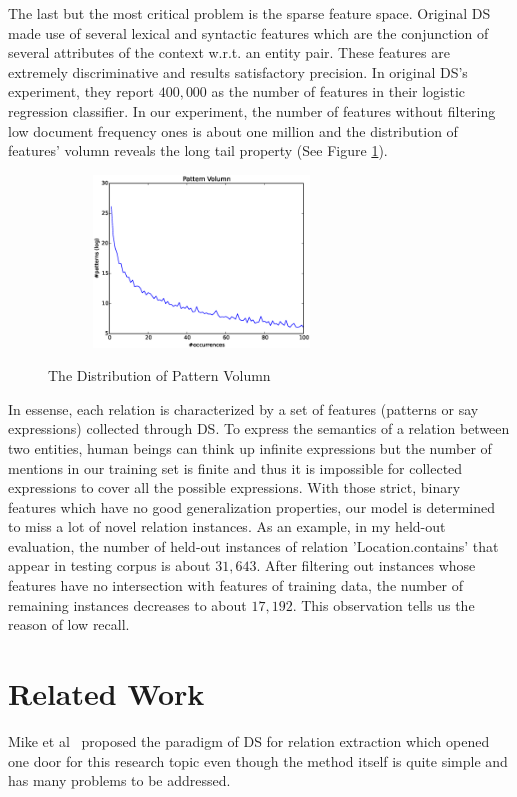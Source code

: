 \documentclass[10pt]{article} %
\theoremstyle{definition}
\theoremstyle{definition}
\begin{document}
The last but the most critical problem is the sparse feature space. 
Original DS made use of several lexical and syntactic features which are the conjunction of several attributes of the context w.r.t. an entity pair. 
These features are extremely discriminative and results satisfactory precision. 
In original DS's experiment, they report $400,000$ as the number of features in their logistic regression classifier. 
In our experiment, the number of features without filtering low document frequency ones is about one million and the distribution of features' volumn reveals the long tail property (See Figure \ref{fig:pv}). 
\begin{figure}
\centering
\includegraphics[width=3.2in,height=1.8in]{pv.eps}
\label{fig:pv}
\caption{The Distribution of Pattern Volumn}
\end{figure}
In essense, each relation is characterized by a set of features (patterns or say expressions) collected through DS. 
To express the semantics of a relation between two entities, human beings can think up infinite expressions 
but the number of mentions in our training set is finite and thus it is impossible for collected expressions to cover all the possible expressions. 
With those strict, binary features which have no good generalization properties, our model is determined to miss a lot of novel relation instances. 
As an example, in my held-out evaluation, the number of held-out instances of relation 'Location.contains' that appear in testing corpus is about $31,643$. 
After filtering out instances whose features have no intersection with features of training data, the number of remaining instances decreases to about $17,192$. 
This observation tells us the reason of low recall. 



\section{Related Work}
Mike et al~\cite{mintz} proposed the paradigm of DS for relation extraction which opened one door for this research topic even though the method itself is quite simple and has many problems to be addressed. 
\end{document}
